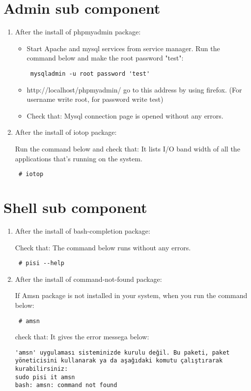 \documentclass[a4paper,10pt]{article}
\begin{document}
\section{Admin sub component}
\begin{enumerate}
 \item After the install of phpmyadmin package:
\begin{itemize}
 \item Start Apache and mysql services from service manager. Run the command below and make the root password "test":
\begin{verbatim}
 mysqladmin -u root password 'test'
\end{verbatim}

 \item http://localhost/phpmyadmin/ go to this address by using firefox. (For username write root, for password  write test)
 \item Check that: Mysql connection page is opened without any errors.
\end{itemize}



 \item After the install of iotop package:

Run the command below and check that: It lists I/O band width of all the applications that's running on the system.
\begin{verbatim}
 # iotop
\end{verbatim}

\end{enumerate}
\section{Shell sub component}
\begin{enumerate}
 \item After the install of bash-completion package:

Check that: The command below runs without any errors.
\begin{verbatim}
 # pisi --help
\end{verbatim}

\item After the install of command-not-found package:

If Amsn package is not installed in your system, when you run the command below:
\begin{verbatim}
 # amsn
\end{verbatim}

check that: It gives the error messega below:
\begin{verbatim}
'amsn' uygulaması sisteminizde kurulu değil. Bu paketi, paket yöneticisini kullanarak ya da aşağıdaki komutu çalıştırarak kurabilirsiniz:
sudo pisi it amsn
bash: amsn: command not found
\end{verbatim}

\end{enumerate}
\end{document}
